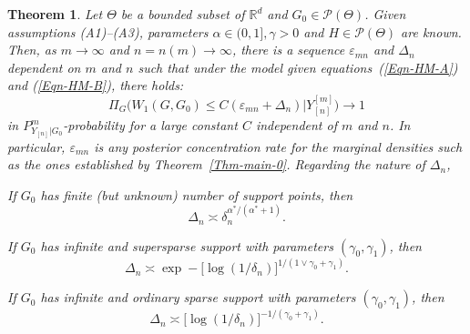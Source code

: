 \documentclass[MSNbibl,number,citesort]{arxbj}
\newcommand{\eqref}[1]{(\ref{#1})}
\newtheorem{theorem}{Theorem}[section]
\newcommand{\real}{\mathbb{R}}
\newcommand{\Pcal}{\mathscr{P}}
\newcommand{\supp}{\operatorname{spt}}
\newcommand{\PGz}{P_{Y_{[n]}|G_0}}
\newcommand{\YYn}{Y_{[n]}}
\newcommand{\epsmn}{\varepsilon_{mn}}
\begin{document}
%
\begin{theorem}
\label{Thm-main-1}
Let $\Theta$ be a bounded subset of $\real^d$ and $G_0 \in\Pcal
(\Theta
)$. Given
assumptions \textup{(A1)}--\textup{(A3)}, parameters $\alpha\in(0,1],
\gamma> 0$ and $H \in\Pcal(\Theta)$ are known.
Then, as $m \rightarrow\infty$ and $n = n(m) \rightarrow\infty$,
there is a sequence $\epsmn$ and $\Delta_n$ dependent on $m$ and $n$
such that
under the model given equations~\eqref{Eqn-HM-A} and \eqref{Eqn-HM-B},
there holds:
%
\[
\Pi_G \bigl(W_1(G,G_0) \leq C (\epsmn+
\Delta_n) | \YYn^{[m]} \bigr) \longrightarrow1
\]
%
in $\PGz^m$-probability for a large constant $C$ independent of
$m$ and $n$.
In particular,
$\epsmn$ is any posterior concentration rate for the marginal
densities such as the ones established by Theorem~\ref{Thm-main-0}.
Regarding the nature of $\Delta_n$,
%
\begin{longlist}[(iii)]
%
\item[(i)] If $G_0$ has finite (but unknown) number of support points, then
%
\[
\Delta_n \asymp\delta_n^{{\alpha^*}/({\alpha^*}+1)}.
\]

\item[(ii)] If $G_0$ has infinite and supersparse support with parameters
$(\gamma_0,\gamma_1)$, then
%
\[
\Delta_n \asymp\exp- \bigl[\log(1/\delta_n)
\bigr]^{1/(1\vee\gamma_0 +\gamma_1)}.
\]

\item[(iii)] If $G_0$ has infinite and ordinary sparse support with parameters
$(\gamma_0,\gamma_1)$, then
%
\[
\Delta_n \asymp \bigl[\log(1/\delta_n)
\bigr]^{-1/(\gamma_0+\gamma_1)}.
\]
%
\end{longlist}
%
\end{theorem}
%

\end{document}
